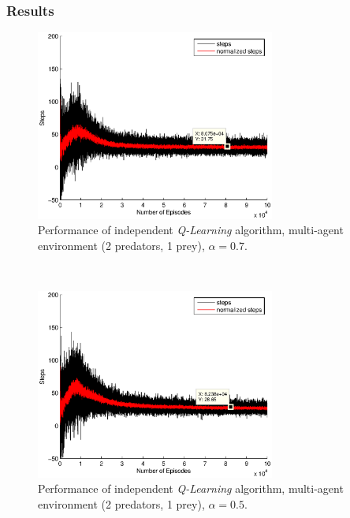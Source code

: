 \documentclass[a4paper,11pt]{article}
\begin{document}
\subsubsection{Results}

\begin{figure}[ht!]
  \centering
    \includegraphics[width=0.7\textwidth]{figures/q207.eps}
    \caption{Performance of independent \textit{Q-Learning} algorithm, multi-agent environment (2 predators, 1 prey), $\alpha = 0.7$.}
    \label{q21}
\end{figure}
~
\begin{figure}[ht!]
  \centering
	\includegraphics[width=0.7\textwidth]{figures/q205.eps}
   \caption{Performance of independent \textit{Q-Learning} algorithm, multi-agent environment (2 predators, 1 prey), $\alpha = 0.5$.}
    \label{q22}
\end{figure}
~
\end{document}
